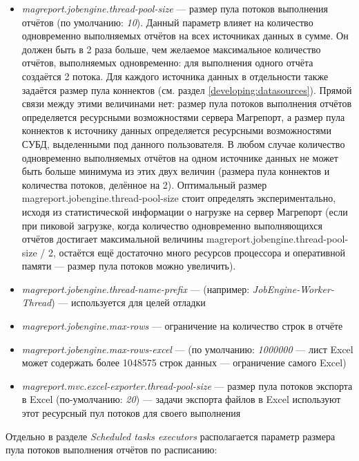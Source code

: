 \documentclass[../user-manual.tex]{subfiles}
\begin{document}
	\begin{itemize}
		\item \textit{magreport.jobengine.thread-pool-size} --- размер пула потоков выполнения отчётов (по умолчанию: \textit{10}). Данный параметр влияет на количество одновременно выполняемых отчётов на всех источниках данных в сумме. Он должен быть в 2 раза больше, чем желаемое максимальное количество отчётов, выполняемых одновременно: для выполнения одного отчёта создаётся 2 потока. Для каждого источника данных в отдельности также задаётся размер пула коннектов (см. раздел \ref{developing:datasources}). Прямой связи между этими величинами нет: размер пула потоков выполнения отчётов определяется ресурсными возможностями сервера Магрепорт, а размер пула коннектов к источнику данных определяется ресурсными возможностями СУБД, выделенными под данного пользователя. В любом случае количество одновременно выполняемых отчётов на одном источнике данных не может быть больше минимума из этих двух величин (размера пула коннектов и количества потоков, делённое на 2). Оптимальный размер magreport.jobengine.thread-pool-size стоит определять экспериментально, исходя из статистической информации о нагрузке на сервер Магрепорт (если при пиковой загрузке, когда количество одновременно выполняющихся отчётов достигает максимальной величины magreport.jobengine.thread-pool-size / 2, остаётся ещё достаточно много ресурсов процессора и оперативной памяти --- размер пула потоков можно увеличить).
		
		\item \textit{magreport.jobengine.thread-name-prefix} --- (например: \textit{JobEngine-Worker-Thread}) --- используется для целей отладки
		
		\item \textit{magreport.jobengine.max-rows} --- ограничение на количество строк в отчёте 
		
		\item \textit{magreport.jobengine.max-rows-excel} --- (по умолчанию: \textit{1000000} --- лист Excel может содержать более 1048575 строк данных --- ограничение самого Excel)
		
		\item \textit{magreport.mvc.excel-exporter.thread-pool-size} --- размер пула потоков экспорта в Excel (по-умолчанию: \textit{20}) --- задачи экспорта файлов в Excel используют этот ресурсный пул потоков для своего выполнения
	\end{itemize}

	Отдельно в разделе \textit{Scheduled tasks executors} располагается параметр размера пула потоков выполнения отчётов по расписанию:
	
\end{document}
